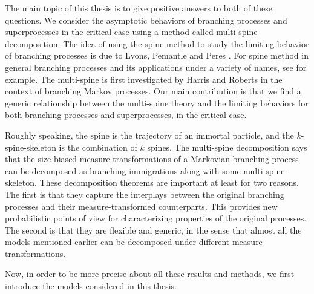 \documentclass[UTF8]{pkuthss}
\theoremstyle{plain}
\theoremstyle{definition}
\numberwithin{equation}{section}
\begin{document}
    The main topic of this thesis is to give positive answers to both of these questions. 
    We consider the asymptotic behaviors of branching processes and superprocesses in the critical case using a method called multi-spine decomposition. 
    The idea of using the spine method to study the limiting behavior of branching processes is due to Lyons, Pemantle and Peres \cite{LyonsPemantlePeres1995Conceptual}. 
    For spine method in general branching processes and its applications under a variety of names, see \cite{Aidekon2013Convergence,AidekonShi2014The-Seneta-Heyde,BigginsKyprianou2004Measure,ChauvinRouault1988KPP-equation,Englander2009Law,EnglanderHarrisKyprianou2010Strong,EnglanderKyprianou2004Local,GeorgiiBaake2003Supercritical,HuShi2009Minimal,Lambert2007Quasi-stationary,LiuRenSong2011LlogL,RenYang2014Multitype} for example.
    The multi-spine is first investigated by Harris and Roberts \cite{HarrisRoberts2017The-many-to-few} in the context of branching Markov processes. 
    Our main contribution is that we find a generic relationship between the multi-spine theory and the limiting behaviors for both branching processes and superprocesses, in the critical case.


    Roughly speaking, the spine is the trajectory of an immortal particle, and the $k$-spine-skeleton is the combination of $k$ spines.
    The multi-spine decomposition says that the size-biased measure transformations of a Markovian branching process can be decomposed as branching immigrations along with some multi-spine-skeleton.
    These decomposition theorems are important at least for two reasons. 
    The first is that they capture the interplays between the original branching processes and their measure-transformed counterparts. 
    This provides new probabilistic points of view for characterizing properties of the original processes.
    The second is that they are flexible and generic, in the sense that almost all the models mentioned earlier can be decomposed under different measure transformations. 

    Now, in order to be more precise about all these results and methods, we first introduce the models considered in this thesis.
\end{document}

